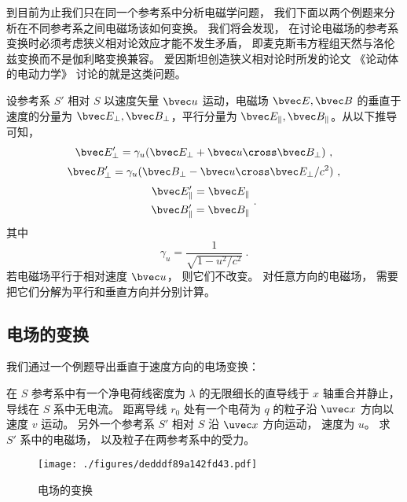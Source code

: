 
\begin{issues}
\issueTODO
{}
\end{issues}


到目前为止我们只在同一个参考系中分析电磁学问题， 我们下面以两个例题来分析在不同参考系之间电磁场该如何变换。 我们将会发现， 在讨论电磁场的参考系变换时必须考虑狭义相对论效应才能不发生矛盾， 即麦克斯韦方程组天然与洛伦兹变换而不是伽利略变换兼容。 爱因斯坦创造狭义相对论时所发的论文 《论动体的电动力学》 讨论的就是这类问题。

设参考系 $S'$ 相对 $S$ 以速度矢量 $\bvec u$ 运动，电磁场 $\bvec E, \bvec B$ 的垂直于速度的分量为 $\bvec E_\perp, \bvec B_\perp$，平行分量为 $\bvec E_\parallel, \bvec B_\parallel$。从以下推导可知，
\begin{equation}\label{eq_EMRef_1}
\bvec E_\perp' = \gamma_u (\bvec E_\perp + \bvec u \cross \bvec B_\perp)~,
\end{equation}
\begin{equation}\label{eq_EMRef_2}
\bvec B_\perp' = \gamma_u (\bvec B_\perp - \bvec u \cross \bvec E_\perp/c^2)~,
\end{equation}
\begin{equation}
\begin{aligned}
\bvec E_\parallel' =\bvec E_\parallel\\ 
\bvec B_\parallel' =\bvec B_\parallel
\end{aligned}~.
\end{equation}
其中
\begin{equation}
\gamma_u = \frac{1}{\sqrt{1 - u^2/c^2}}~.
\end{equation}
若电磁场平行于相对速度 $\bvec u$， 则它们不改变。 对任意方向的电磁场， 需要把它们分解为平行和垂直方向并分别计算。

\subsection{电场的变换}
我们通过一个例题导出垂直于速度方向的电场变换：

\begin{example}{}
在 $S$ 参考系中有一个净电荷线密度为 $\lambda$ 的无限细长的直导线于 $x$ 轴重合并静止，导线在 $S$ 系中无电流。 距离导线 $r_0$ 处有一个电荷为 $q$ 的粒子沿 $\uvec x$ 方向以速度 $v$ 运动。 另外一个参考系 $S'$ 相对 $S$ 沿 $\uvec x$ 方向运动， 速度为 $u$。 求 $S'$ 系中的电磁场， 以及粒子在两参考系中的受力。
\begin{figure}[ht]
\centering
\texttt{[image: ./figures/dedddf89a142fd43.pdf]}
\caption{电场的变换} \label{fig_EMRef_1}
\end{figure}
\end{example}

